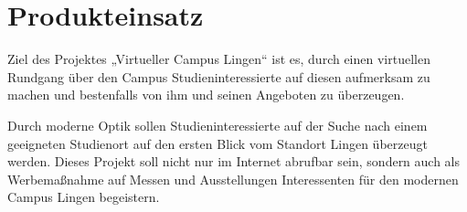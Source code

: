 \section{Produkteinsatz}
\label{sec:Produkteinsatz}

Ziel des Projektes „Virtueller Campus Lingen“ ist es, durch einen virtuellen Rundgang
über den Campus Studieninteressierte auf diesen aufmerksam zu machen und bestenfalls
von ihm und seinen Angeboten zu überzeugen.

Durch moderne Optik sollen Studieninteressierte auf der Suche nach einem geeigneten
Studienort auf den ersten Blick vom Standort Lingen überzeugt werden. Dieses Projekt
soll nicht nur im Internet abrufbar sein, sondern auch als Werbemaßnahme auf Messen
und Ausstellungen Interessenten für den modernen Campus Lingen begeistern.